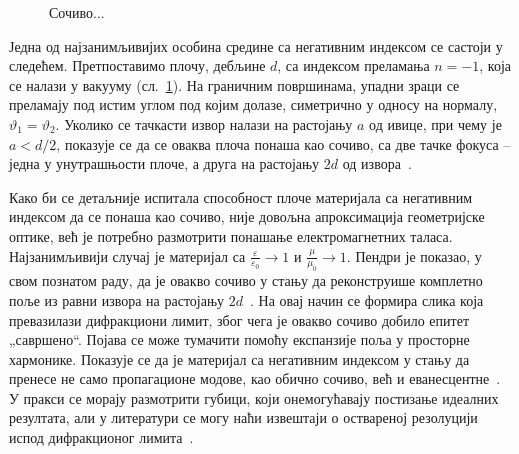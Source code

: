 \documentclass[12pt,oneside]{book}
\begin{document}
\begin{figure}[h]
    \caption{Сочиво...}
    \label{uvod:ssocivo}
\end{figure}
Једна од најзанимљивијих особина средине са негативним индексом се састоји у следећем. Претпоставимо плочу, дебљине $d$, са индексом преламања $n=-1$, која се налази у вакууму (сл.~\ref{uvod:ssocivo}). На граничним површинама, упадни зраци се преламају под истим углом под којим долазе, симетрично у односу на нормалу, $\vartheta_1 = \vartheta_2$. Уколико се тачкасти извор налази на растојању $a$ од ивице, при чему је $a<d/2$, показује се да се оваква плоча понаша као сочиво, са две тачке фокуса -- једна у унутрашњости плоче, а друга на растојању $2d$ од извора~\cite{veselago_cir}.

Како би се детаљније испитала способност плоче материјала са негативним индексом да се понаша као сочиво, није довољна апроксимација геометријске оптике, већ је потребно размотрити понашање електромагнетних таласа. Најзанимљивији случај је материјал са $\frac{\varepsilon}{\varepsilon_0}\to 1$ и $\frac{\mu}{\mu_0}\to 1$. Пендри је показао, у свом познатом раду, да је овакво сочиво у стању да реконструише комплетно поље из равни извора на растојању $2d$~\cite{pendry3}. На овај начин се формира слика која превазилази дифракциони лимит, због чега је овакво сочиво добило епитет „савршено``. Појава се може тумачити помоћу експанзије поља у просторне хармонике. Показује се да је материјал са негативним индексом у стању да пренесе не само пропагационе модове, као обично сочиво, већ и еванесцентне~\cite{markes_knjiga}. У пракси се морају размотрити губици, који онемогућавају постизање идеалних резултата, али у литератури се могу наћи извештаји о оствареној резолуцији испод дифракционог лимита~\cite{grbic2004overcoming}.
\end{document}
